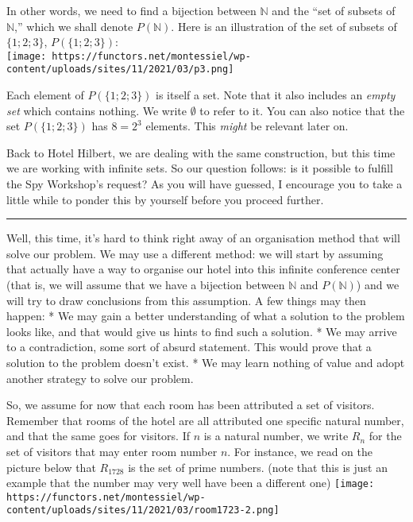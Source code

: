 \documentclass[
]{article}
\begin{document}
In other words, we need to find a bijection between \(\mathbb{N}\) and
the ``set of subsets of \(\mathbb{N}\),'' which we shall denote
\(P(\mathbb{N})\). Here is an illustration of the set of subsets of
\(\{1;2;3\}\), \(P(\{1;2;3\})\):\\
\texttt{[image: https://functors.net/montessiel/wp-content/uploads/sites/11/2021/03/p3.png]}

Each element of \(P(\{1;2;3\})\) is itself a set. Note that it also
includes an \emph{empty set} which contains nothing. We write
\(\emptyset\) to refer to it. You can also notice that the set
\(P(\{1;2;3\})\) has \(8 = 2^3\) elements. This \emph{might} be relevant
later on.

Back to Hotel Hilbert, we are dealing with the same construction, but
this time we are working with infinite sets. So our question follows: is
it possible to fulfill the Spy Workshop's request? As you will have
guessed, I encourage you to take a little while to ponder this by
yourself before you proceed further.

\begin{center}\rule{0.5\linewidth}{0.5pt}\end{center}

Well, this time, it's hard to think right away of an organisation method
that will solve our problem. We may use a different method: we will
start by assuming that actually have a way to organise our hotel into
this infinite conference center (that is, we will assume that we have a
bijection between \(\mathbb{N}\) and \(P(\mathbb{N})\)) and we will try
to draw conclusions from this assumption. A few things may then happen:
* We may gain a better understanding of what a solution to the problem
looks like, and that would give us hints to find such a solution. * We
may arrive to a contradiction, some sort of absurd statement. This would
prove that a solution to the problem doesn't exist. * We may learn
nothing of value and adopt another strategy to solve our problem.

So, we assume for now that each room has been attributed a set of
visitors. Remember that rooms of the hotel are all attributed one
specific natural number, and that the same goes for visitors. If \(n\)
is a natural number, we write \(R_n\) for the set of visitors that may
enter room number \(n\). For instance, we read on the picture below that
\(R_{1728}\) is the set of prime numbers. (note that this is just an
example that the number may very well have been a different one)
\texttt{[image: https://functors.net/montessiel/wp-content/uploads/sites/11/2021/03/room1723-2.png]}
\end{document}
